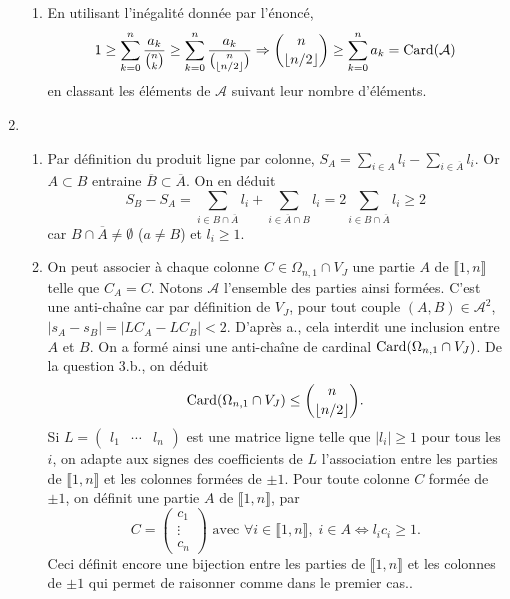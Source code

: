 \begin{enumerate}
\begin{enumerate}
  \item En utilisant l'inégalité donnée par l'énoncé,
\[
 1 \geq \sum_{k=0}^n \frac{a_k}{\binom{n}{k}} 
 \geq \sum_{k=0}^n \frac{a_k}{\binom{n}{\lfloor n/2\rfloor}}
 \Rightarrow 
 \binom{n}{\lfloor n/2\rfloor} \geq \sum_{k=0}^n a_k = \operatorname{Card}(\mathcal{A})
\]
  en classant les éléments de $\mathcal{A}$ suivant leur nombre d'éléments.
 \end{enumerate}

 \item
 \begin{enumerate}
  \item Par définition du produit ligne par colonne, $S_A = \sum_{i \in A}l_i - \sum_{i \in \overline{A}}l_i$. Or $A\subset B$ entraine $\overline{B} \subset \overline{A}$. On en déduit
  \[
   S_B - S_A = \sum_{i\in B\cap \overline{A}} l_i + \sum_{i \in \overline{A}\cap B}l_i = 2\sum_{i\in B\cap \overline{A}} l_i \geq 2
  \]
car $B\cap \overline{A} \neq \emptyset$ ($a\neq B$) et $l_i \geq 1$.

  \item On peut associer à chaque colonne $C \in \Omega_{n,1} \cap V_J$ une partie $A$ de $\llbracket 1,n \rrbracket$ telle que $C_A = C$. Notons $\mathcal{A}$ l'ensemble des parties ainsi formées. C'est une anti-chaîne car par définition de $V_J$, pour tout couple $(A,B)\in \mathcal{A}^2$, $|s_A - s_B| = |LC_A - LC_B| < 2$. D'après a., cela interdit une inclusion entre $A$ et $B$. On a formé ainsi une anti-chaîne de cardinal $\operatorname{Card}(\Omega_{n,1} \cap V_J)$. De la question 3.b., on déduit
  \[
   \operatorname{Card}(\Omega_{n,1} \cap V_J) \leq \binom{n}{\lfloor n/2\rfloor}.
  \]
Si $L = \begin{pmatrix} l_1 & \cdots & l_n \end{pmatrix}$ est une matrice ligne telle que $|l_i|\geq 1$ pour tous les $i$, on adapte aux signes des coefficients de $L$ l'association entre les parties de $\llbracket 1,n \rrbracket$ et les colonnes formées de $\pm 1$. \newline
 Pour toute colonne $C$ formée de $\pm 1$, on définit une partie $A$ de $\llbracket 1,n  \rrbracket$, par
 \[
  C = 
  \begin{pmatrix}
   c_1 \\ \vdots \\ c_n
  \end{pmatrix}
  \text{ avec } \forall i \in \llbracket 1,n \rrbracket, \;
  i \in A \Leftrightarrow l_ic_i \geq 1.
 \]
Ceci définit encore une bijection entre les parties de $\llbracket 1,n \rrbracket$ et les colonnes de $\pm 1$ qui permet de raisonner comme dans le premier cas.. 
 \end{enumerate}

\end{enumerate}

